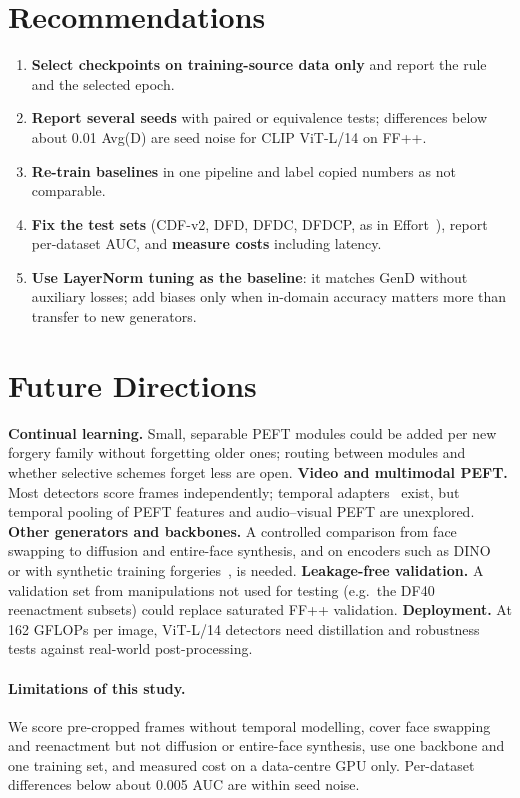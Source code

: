 \documentclass[fonts]{icst}
\begin{document}
\section{Recommendations}
\label{sec:recommend}
\begin{enumerate}[leftmargin=*, topsep=2pt, itemsep=1pt]
    \item \textbf{Select checkpoints on training-source data only} and report the rule and the selected epoch.
    \item \textbf{Report several seeds} with paired or equivalence tests; differences below about 0.01 Avg(D) are seed noise for CLIP ViT-L/14 on FF++.
    \item \textbf{Re-train baselines} in one pipeline and label copied numbers as not comparable.
    \item \textbf{Fix the test sets} (CDF-v2, DFD, DFDC, DFDCP, as in Effort~\cite{yan2025effort}), report per-dataset AUC, and \textbf{measure costs} including latency.
    \item \textbf{Use LayerNorm tuning as the baseline}: it matches GenD without auxiliary losses; add biases only when in-domain accuracy matters more than transfer to new generators.
\end{enumerate}

\section{Future Directions}
\label{sec:open}
\textbf{Continual learning.} Small, separable PEFT modules could be added per new forgery family without forgetting older ones; routing between modules and whether selective schemes forget less are open.
\textbf{Video and multimodal PEFT.} Most detectors score frames independently; temporal adapters~\cite{han2024fcg} exist, but temporal pooling of PEFT features and audio--visual PEFT are unexplored.
\textbf{Other generators and backbones.} A controlled comparison from face swapping to diffusion and entire-face synthesis, and on encoders such as DINO~\cite{caron2021emerging} or with synthetic training forgeries~\cite{shiohara2022sbi}, is needed.
\textbf{Leakage-free validation.} A validation set from manipulations not used for testing (e.g.\ the DF40 reenactment subsets) could replace saturated FF++ validation.
\textbf{Deployment.} At 162 GFLOPs per image, ViT-L/14 detectors need distillation and robustness tests against real-world post-processing.

\paragraph{Limitations of this study.}\label{sec:limits} We score pre-cropped frames without temporal modelling, cover face swapping and reenactment but not diffusion or entire-face synthesis, use one backbone and one training set, and measured cost on a data-centre GPU only. Per-dataset differences below about 0.005 AUC are within seed noise.
\end{document}
